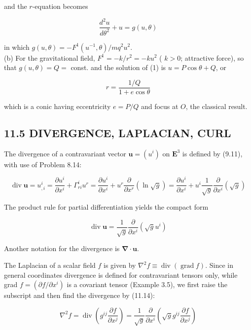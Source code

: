 \documentclass[10pt]{article}
\begin{document}
and the $r$-equation becomes


\begin{equation*}
\frac{d^{2} u}{d \theta^{2}}+u=g(u, \theta) \tag{1}
\end{equation*}


in which $g(u, \theta)=-F^{1}\left(u^{-1}, \theta\right) / m q^{2} u^{2}$.\\
(b) For the gravitational field, $F^{1}=-k / r^{2}=-k u^{2}$ ( $k>0$; attractive force), so that $g(u, \theta)=Q=$ const. and the solution of (1) is $u=P \cos \theta+Q$, or


\begin{equation*}
r=\frac{1 / Q}{1+e \cos \theta} \tag{2}
\end{equation*}


which is a conic having eccentricity $e=P / Q$ and focus at $O$, the classical result.

\subsection*{11.5 DIVERGENCE, LAPLACIAN, CURL}
The divergence of a contravariant vector $\mathbf{u}=\left(u^{i}\right)$ on $\mathbf{E}^{3}$ is defined by (9.11), with use of Problem 8.14:

$$
\operatorname{div} \mathbf{u}=u_{, i}^{i}=\frac{\partial u^{i}}{\partial x^{i}}+\Gamma_{r i}^{i} u^{r}=\frac{\partial u^{i}}{\partial x^{i}}+u^{r} \frac{\partial}{\partial x^{r}}(\ln \sqrt{g})=\frac{\partial u^{i}}{\partial x^{i}}+u^{i} \frac{1}{\sqrt{g}} \frac{\partial}{\partial x^{i}}(\sqrt{g})
$$

The product rule for partial differentiation yields the compact form


\begin{equation*}
\operatorname{div} \mathbf{u}=\frac{1}{\sqrt{g}} \frac{\partial}{\partial x^{i}}\left(\sqrt{g} u^{i}\right) \tag{11.14}
\end{equation*}


Another notation for the divergence is $\boldsymbol{\nabla} \cdot \mathbf{u}$.

The Laplacian of a scalar field $f$ is given by $\nabla^{2} f \equiv \operatorname{div}(\operatorname{grad} f)$. Since in general coordinates divergence is defined for contravariant tensors only, while grad $f=\left(\partial f / \partial x^{i}\right)$ is a covariant tensor (Example 3.5), we first raise the subscript and then find the divergence by (11.14):


\begin{equation*}
\nabla^{2} f=\operatorname{div}\left(g^{i j} \frac{\partial f}{\partial x^{j}}\right)=\frac{1}{\sqrt{g}} \frac{\partial}{\partial x^{i}}\left(\sqrt{g} g^{i j} \frac{\partial f}{\partial x^{j}}\right) \tag{11.15}
\end{equation*}
\end{document}
